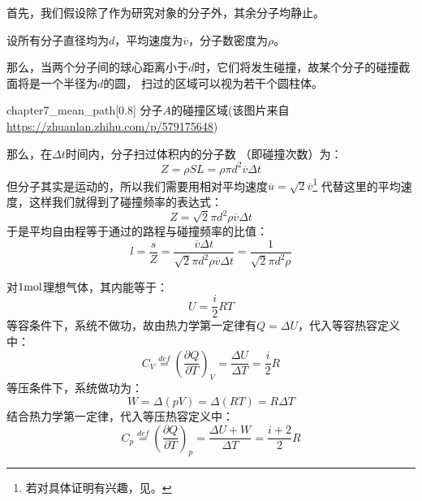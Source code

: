         \begin{prove}
            首先，我们假设除了作为研究对象的分子外，其余分子均静止。
            
            设所有分子直径均为$d$，平均速度为$\overline{v}$，分子数密度为$\rho$。
            
            那么，当两个分子间的球心距离小于$d$时，它们将发生碰撞，故某个分子的碰撞截面将是一个半径为$d$的圆，
            扫过的区域可以视为若干个圆柱体。
            \begin{singlefigure}{chapter7_mean_path}[0.8]
            	分子$A$的碰撞区域(该图片来自\url{https://zhuanlan.zhihu.com/p/579175648})
            \end{singlefigure}
            那么，在$\Delta t$时间内，分子扫过体积内的分子数 （即碰撞次数）为：
            \begin{equation}
                Z =\rho SL =\rho \pi d^{2} \overline{v} \Delta t
                \nonumber
            \end{equation}
            但分子其实是运动的，所以我们需要用相对平均速度$\overline{u} = \sqrt{2}\overline{v}$\footnote{若对具体证明有兴趣，见。}
            代替这里的平均速度，这样我们就得到了碰撞频率的表达式：
            \begin{equation}
                Z =\sqrt{2}\pi d^{2} \rho \overline{v} \Delta t
            \end{equation}
            于是平均自由程等于通过的路程与碰撞频率的比值：
            \begin{equation}
                l = \frac{s}{Z} = \frac{\overline{v}\Delta t }{\sqrt{2}\pi d^{2} \rho \overline{v} \Delta t} = \frac{1}{\sqrt{2}\pi d^{2} \rho}
            \end{equation}
        \end{prove}
        \begin{prove}
            对$1\rm{mol}$理想气体，其内能等于：
            \begin{equation}
                U = \frac{i}{2}RT
                \nonumber
            \end{equation}
            等容条件下，系统不做功，故由热力学第一定律有$Q = \Delta U$，代入等容热容定义中：
            \begin{equation}
                C_{V} \overset{def}{=} \left(\frac{\partial{Q}}{\partial{T}}\right)_{V} =\frac{\Delta U}{\Delta T}
                =\frac{i}{2}R
            \end{equation}
            等压条件下，系统做功为：
            \begin{equation}
                W = \Delta (pV) = \Delta (RT) =  R\Delta T
                \nonumber
            \end{equation}
            结合热力学第一定律，代入等压热容定义中：
            \begin{equation}
                C_{p} \overset{def}{=} \left(\frac{\partial{Q}}{\partial{T}}\right)_{p} = \frac{\Delta U + W}{\Delta T} 
                = \frac{i+2}{2}R
            \end{equation}
        \end{prove}
